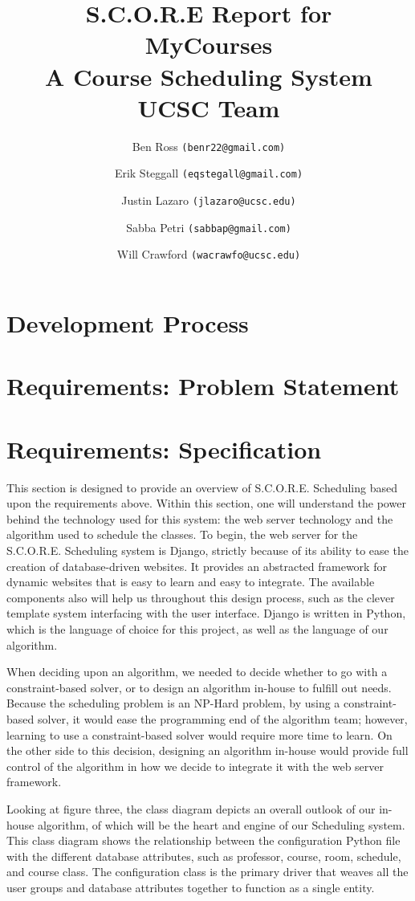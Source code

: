 \documentclass[12pt,article]{memoir}
\title{S.C.O.R.E Report for\\ MyCourses \\ A Course Scheduling System \\ UCSC Team}
\author{Ben Ross \texttt{(benr22@gmail.com)} \\
	\and Erik Steggall \texttt{(eqstegall@gmail.com)}\\
	\and Justin Lazaro \texttt{(jlazaro@ucsc.edu)}\\
	\and Sabba Petri \texttt{(sabbap@gmail.com)}\\
	\and Will Crawford \texttt{(wacrawfo@ucsc.edu)}}
\date{}
\begin{document}
\maketitle

\chapter{Development Process} %

\chapter{Requirements: Problem Statement} %
\chapter{Requirements: Specification} %
This section is designed to provide an overview of S.C.O.R.E. Scheduling based upon the requirements above. Within this section, one will understand the power behind the technology used for this system: the web server technology and the algorithm used to schedule the classes. To begin, the web server for the S.C.O.R.E. Scheduling system is Django, strictly because of its ability to ease the creation of database-driven websites. It provides an abstracted framework for dynamic websites that is easy to learn and easy to integrate. The available components also will help us throughout this design process, such as the clever template system interfacing with the user interface. Django is written in Python, which is the language of choice for this project, as well as the language of our algorithm.

When deciding upon an algorithm, we needed to decide whether to go with a constraint-based solver, or to design an algorithm in-house to fulfill out needs. Because the scheduling problem is an NP-Hard problem, by using a constraint-based solver, it would ease the programming end of the algorithm team; however, learning to use a constraint-based solver would require more time to learn. On the other side to this decision, designing an algorithm in-house would provide full control of the algorithm in how we decide to integrate it with the web server framework.

Looking at figure three, the class diagram depicts an overall outlook of our in-house algorithm, of which will be the heart and engine of our Scheduling system. This class diagram shows the relationship between the configuration Python file with the different database attributes, such as professor, course, room, schedule, and course class. The configuration class is the primary driver that weaves all the user groups and database attributes together to function as a single entity.  
\end{document}
